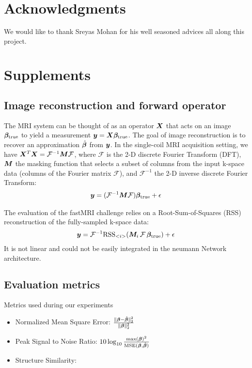 \documentclass{article}
\begin{document}
\section{Acknowledgments}
We would like to thank Sreyas Mohan for his well seasoned advices all along this project.

\nocite{*}



\section{Supplements}
\subsection{Image reconstruction and forward operator}
The MRI system can be thought of as an operator $\bm{X}$ that acts on an image $\bm{\beta}_{\text{true}}$ to yield a measurement $\bm{y}= \bm{X} \bm{\beta}_{\text{true}}$.
The goal of image reconstruction is to recover an approximation $\hat{\bm{\beta}}$ from $\bm{y}$.
In the single-coil MRI acquisition setting, we have $\bm{X}^T \bm{X} = \mathcal{F}^{-1} \bm{M} \mathcal{F}$, where $\mathcal{F}$ is the 2-D discrete Fourier Transform (DFT), $\bm{M}$ the masking function that selects a subset of columns from the input k-space data (columns of the Fourier matrix  $\mathcal{F}$), and $\mathcal{F}^{-1}$ the 2-D inverse discrete Fourier Transform:
$$
	\bm{y}	= (\mathcal{F}^{-1} \bm{M} \mathcal{F}) \bm{\beta}_{\text{true}} + \epsilon			
$$
 
The evaluation of the fastMRI challenge relies on a Root-Sum-of-Squares (RSS) reconstruction of the fully-sampled k-space data:
$$
	\bm{y}	= \mathcal{F}^{-1} \text{RSS}_{<i>} (\bm{M}_i \, \mathcal{F} \, \bm{\beta}_{\text{true}}) + \epsilon			
$$
It is not linear and could not be easily integrated in the neumann Network architecture.
 
\subsection{Evaluation metrics}
Metrics used during our experiments
\begin{itemize}
	\item Normalized Mean Square Error: $\frac{ \| \bm{\beta} - \hat{\bm{\beta}} \|_2^2 } { \|  \bm{\beta} \|_2^2 }$
	\item Peak Signal to Noise Ratio: $10 \log_{10} \frac {\max({\bm{\beta}})^2 } {\text{MSE} (\bm{\beta}, \hat{\bm{\beta}})}$
	\item Structure Similarity:
\end{itemize}
\end{document}
